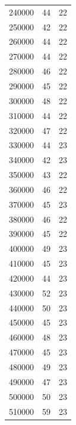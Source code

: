 \documentclass{article}
\begin{document}
\begin{longtable}{c|c|c}
           240000 &            44 &            22 \\
           250000 &            42 &            22 \\
           260000 &            44 &            22 \\
           270000 &            44 &            22 \\
           280000 &            46 &            22 \\
           290000 &            45 &            22 \\
           300000 &            48 &            22 \\
           310000 &            44 &            22 \\
           320000 &            47 &            22 \\
           330000 &            44 &            23 \\
           340000 &            42 &            23 \\
           350000 &            43 &            22 \\
           360000 &            46 &            22 \\
           370000 &            45 &            23 \\
           380000 &            46 &            22 \\
           390000 &            45 &            22 \\
           400000 &            49 &            23 \\
           410000 &            45 &            23 \\
           420000 &            44 &            23 \\
           430000 &            52 &            23 \\
           440000 &            50 &            23 \\
           450000 &            45 &            23 \\
           460000 &            48 &            23 \\
           470000 &            45 &            23 \\
           480000 &            49 &            23 \\
           490000 &            47 &            23 \\
           500000 &            50 &            23 \\
           510000 &            59 &            23 \\

\end{longtable}
\end{document}
